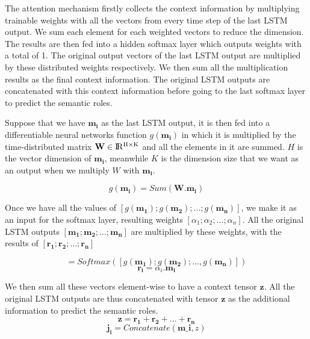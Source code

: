 The attention mechanism firstly collects the context information by multiplying trainable weights with all the vectors from every time step of the last LSTM output. We sum each element for each weighted vectors to reduce the dimension. The results are then fed into a hidden softmax layer which outputs weights with a total of 1. The original output vectors of the last LSTM output are multiplied by these distributed weights respectively. We then sum all the multiplication results as the final context information. The original LSTM outputs are concatenated with this context information before going to the last softmax layer to predict the semantic roles. 

Suppose that we have $\mathbf{m_{i}}$ as the last LSTM output, it is then fed into a differentiable neural networks function $g(\mathbf{m_{i}})$ in which it is multiplied by the time-distributed matrix $\textbf{W} \in {\rm I\!R^{H \times K}}$ and all the elements in it are summed. $H$ is the vector dimension of $\mathbf{m_{i}}$, meanwhile $K$ is the dimension size that we want as an output when we multiply \textbf{$W$} with $\mathbf{m_{i}}$.

\begin{equation}
\label{sum_weight}
g(\mathbf{m_{i}}) = Sum(\mathbf{W}.\mathbf{m_{i}})
\end{equation}

Once we have all the values of $[g(\mathbf{m_{1}}); g(\mathbf{m_{2}}); ...; g(\mathbf{m_{n}})]$, we make it as an input for the softmax layer, resulting weights $[\alpha_{1}; \alpha_{2}; ...; \alpha_{n}]$. All the original LSTM outputs $[\mathbf{m_{1}}; \mathbf{m_{2}}; ...; \mathbf{m_{n}}]$ are multiplied by these weights, with the results of $[\mathbf{r_{1}}; \mathbf{r_{2}}; ...; \mathbf{r_{n}}]$

\begin{equation}
[\alpha_{1}, \alpha_{2}, ..., \alpha_{n}] = Softmax([g(\mathbf{m_{1}}); g(\mathbf{m_{2}}); ..., g(\mathbf{m_{n}})])
\end{equation}
\begin{equation}
\mathbf{r_{i}} = \alpha_{i}.\mathbf{m_{i}}
\end{equation}

We then sum all these vectors element-wise to have a context tensor $\mathbf{z}$. 
All the original LSTM outputs are thus concatenated with tensor $\mathbf{z}$ as the additional information to predict the semantic roles.
\begin{equation}
\mathbf{z} = \mathbf{r_{1}} + \mathbf{r_{2}} + ... + \mathbf{r_{n}}
\end{equation}
\begin{equation}
\mathbf{j_{i}} = Concatenate(\mathbf{m\_{i}}, z)
\end{equation}

